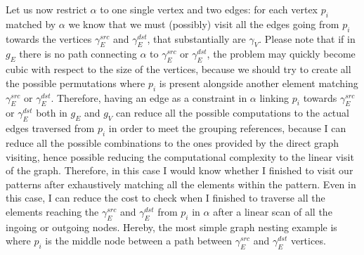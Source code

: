 Let us now restrict $\alpha$ to one single vertex and two edges: for each vertex $p_i$ matched by $\alpha$ we know that we must (possibly) visit all the edges going from $p_i$ towards the vertices $\gamma_E^{src}$ and $\gamma_E^{dst}$, that substantially are $\gamma_V$. Please note that if in $g_E$ there is no path connecting $\alpha$ to $\gamma_E^{src}$ or $\gamma_E^{dst}$, the problem may quickly become cubic with respect to the size of the vertices, because we should try to create all the possible permutations where $p_i$ is present alongside another element matching $\gamma_E^{src}$ or $\gamma_E^{dst}$. Therefore, having an edge as a constraint in $\alpha$ linking $p_i$ towards $\gamma_E^{src}$ or $\gamma_E^{dst}$ both in $g_E$ and $g_V$ can reduce all the possible computations to the actual edges traversed from $p_i$ in order to meet the grouping references, because I can reduce all the possible combinations to the ones provided by the direct graph visiting, hence possible reducing the computational complexity to the linear visit of the graph. Therefore, in this case I would know whether I finished to visit our patterns after exhaustively matching all the elements within the pattern. Even in this case, I can reduce the cost to check when I finished to traverse all the elements reaching the $\gamma_E^{src}$ and $\gamma_E^{dst}$ from $p_i$ in $\alpha$ after a linear scan of all the ingoing or outgoing nodes. Hereby, the most simple graph nesting example is where $p_i$ is the middle node between a path between $\gamma_E^{src}$ and $\gamma_E^{dst}$ vertices. 

